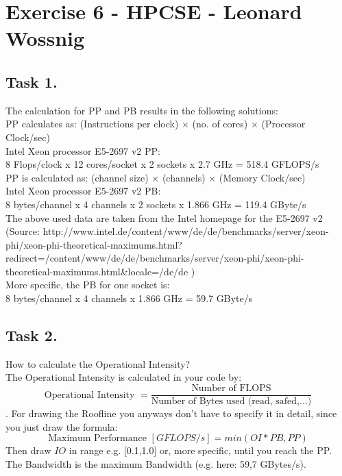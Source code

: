 \documentclass[12pt]{scrbook}
\begin{document}
\section{Exercise 6 - HPCSE - Leonard Wossnig}
\subsection{Task 1.}
The calculation for PP and PB results in the following solutions:\\
PP calculates as: (Instructions per clock) $\times$ (no. of cores) $\times$ (Processor Clock/sec) \\
Intel Xeon processor E5-2697 v2 PP:\\ 8 Flops/clock x 12 cores/socket x 2 sockets x 2.7 GHz = 518.4 GFLOPS/s \\
PP is calculated as: (channel size) $\times$ (channels) $\times$ (Memory Clock/sec)\\
Intel Xeon processor E5-2697 v2 PB:\\ 8 bytes/channel x 4 channels x 2 sockets x 1.866 GHz = 119.4 GByte/s \\
The above used data are taken from the Intel homepage for the E5-2697 v2 \\
(Source: http://www.intel.de/content/www/de/de/benchmarks/server/xeon-phi/xeon-phi-theoretical-maximums.html?redirect=/content/www/de/de/benchmarks/server/xeon-phi/xeon-phi-theoretical-maximums.html\&locale=/de/de )\\
More specific, the PB for one socket is:\\
8 bytes/channel x 4 channels x 1.866 GHz = 59.7 GByte/s

\subsection{Task 2.}
How to calculate the Operational Intensity? \\
The Operational Intensity is calculated in your code by: $$ \text{Operational Intensity }=	 \frac{\text{Number of FLOPS}}{\text{Number of Bytes used (read, safed,...)}}$$. For drawing the Roofline you anyways don't have to specify it in detail, since you just draw the formula:$$ \text{Maximum Performance }[GFLOPS/s] = min(OI * PB, PP)$$ 
Then draw $IO$ in range e.g. [0.1,1.0] or, more specific, until you reach the PP.
The Bandwidth is the maximum Bandwidth (e.g. here: 59,7 GBytes/s). 

\begin{comment}
\begin{minipage}[!t]{0.5\textwidth}
\texttt{[image: ]}
\end{minipage}
\begin{minipage}[!t]{0.5	\textwidth}
\texttt{[image: ]}
\end{minipage}
\end{comment}
\end{document}
